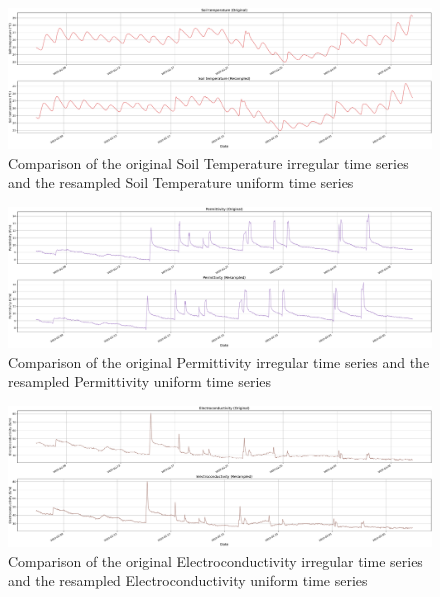 \begin{figure}[htbp]
    \centering
    \includegraphics[width=15 cm]{5_ChapterDesign/figuras/5_Irregular/comparison_Soil_temperature.pdf}
    \caption{Comparison of the original Soil Temperature irregular time series and the resampled Soil Temperature uniform time series}
    \label{comparison_Soil_temperature}
\end{figure}

\begin{figure}[htbp]
    \centering
    \includegraphics[width=15 cm]{5_ChapterDesign/figuras/5_Irregular/comparison_Permittivity.pdf}
    \caption{Comparison of the original Permittivity irregular time series and the resampled Permittivity uniform time series}
    \label{comparison_Permittivity}
\end{figure}

\begin{figure}[htbp]
    \centering
    \includegraphics[width=15 cm]{5_ChapterDesign/figuras/5_Irregular/comparison_Electroconductivity.pdf}
    \caption{Comparison of the original Electroconductivity irregular time series and the resampled Electroconductivity uniform time series}
    \label{comparison_Electroconductivity}
\end{figure}

